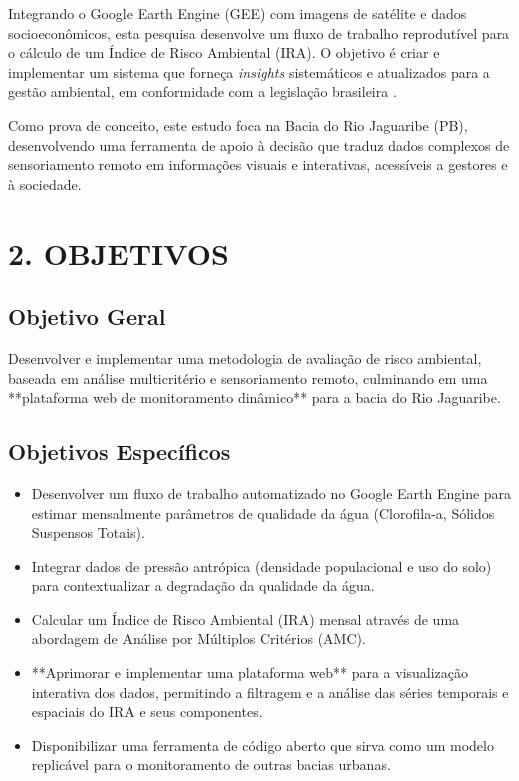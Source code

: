 \documentclass[12pt, a4paper]{article}
\begin{document}
Integrando o Google Earth Engine (GEE) com imagens de satélite e dados socioeconômicos, esta pesquisa desenvolve um fluxo de trabalho reprodutível para o cálculo de um Índice de Risco Ambiental (IRA). O objetivo é criar e implementar um sistema que forneça \textit{insights} sistemáticos e atualizados para a gestão ambiental, em conformidade com a legislação brasileira \cite{conama357, pnrh1997}.

Como prova de conceito, este estudo foca na Bacia do Rio Jaguaribe (PB), desenvolvendo uma ferramenta de apoio à decisão que traduz dados complexos de sensoriamento remoto em informações visuais e interativas, acessíveis a gestores e à sociedade.

\section*{2. OBJETIVOS}
\subsection*{Objetivo Geral}
Desenvolver e implementar uma metodologia de avaliação de risco ambiental, baseada em análise multicritério e sensoriamento remoto, culminando em uma **plataforma web de monitoramento dinâmico** para a bacia do Rio Jaguaribe.

\subsection*{Objetivos Específicos}
\begin{itemize}
    \item Desenvolver um fluxo de trabalho automatizado no Google Earth Engine para estimar mensalmente parâmetros de qualidade da água (Clorofila-a, Sólidos Suspensos Totais).
    \item Integrar dados de pressão antrópica (densidade populacional e uso do solo) para contextualizar a degradação da qualidade da água.
    \item Calcular um Índice de Risco Ambiental (IRA) mensal através de uma abordagem de Análise por Múltiplos Critérios (AMC).
    \item **Aprimorar e implementar uma plataforma web** para a visualização interativa dos dados, permitindo a filtragem e a análise das séries temporais e espaciais do IRA e seus componentes.
    \item Disponibilizar uma ferramenta de código aberto que sirva como um modelo replicável para o monitoramento de outras bacias urbanas.
\end{itemize}
\end{document}
